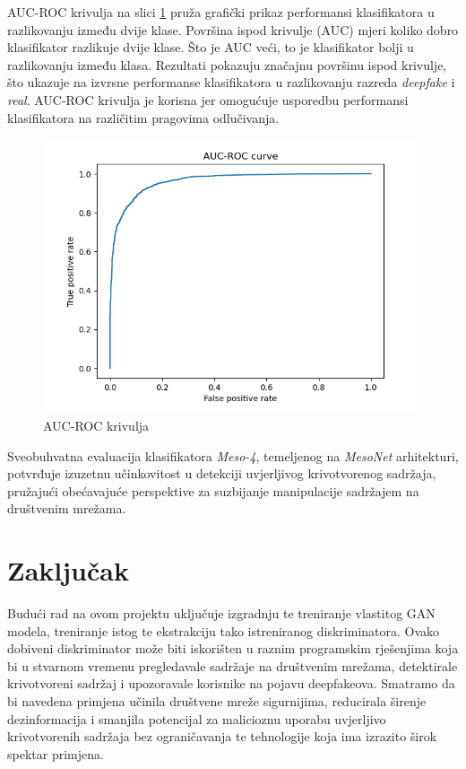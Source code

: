 \documentclass[seminarski, times, utf8]{fer}
\begin{document}
AUC-ROC krivulja na slici \ref{fig:auc} pruža grafički prikaz performansi klasifikatora u razlikovanju između dvije klase. Površina ispod krivulje (AUC) mjeri koliko dobro klasifikator razlikuje dvije klase. Što je AUC veći, to je klasifikator bolji u razlikovanju između klasa. Rezultati pokazuju značajnu površinu ispod krivulje, što ukazuje na izvrsne performanse klasifikatora u razlikovanju razreda \textit{deepfake} i \textit{real}. AUC-ROC krivulja je korisna jer omogućuje usporedbu performansi klasifikatora na različitim pragovima odlučivanja.

\begin{figure}[H]
   \centering
   \includegraphics[width=0.7\linewidth]{slike/auc.png}
   \caption{AUC-ROC krivulja}
   \label{fig:auc}
\end{figure}

Sveobuhvatna evaluacija klasifikatora \textit{Meso-4}, temeljenog na \textit{MesoNet} arhitekturi, potvrđuje izuzetnu učinkovitost u detekciji uvjerljivog krivotvorenog sadržaja, pružajući obećavajuće perspektive za suzbijanje manipulacije sadržajem na društvenim mrežama.


\chapter{Zaključak}
Budući rad na ovom projektu uključuje izgradnju te treniranje vlastitog GAN modela, treniranje istog te ekstrakciju tako istreniranog diskriminatora. Ovako dobiveni diskriminator može biti iskorišten u raznim programskim rješenjima koja bi u stvarnom vremenu pregledavale sadržaje na društvenim mrežama, 
detektirale krivotvoreni sadržaj i upozoravale korisnike na pojavu deepfakeova. Smatramo da bi navedena primjena učinila društvene mreže sigurnijima, reducirala širenje dezinformacija i smanjila potencijal za malicioznu uporabu uvjerljivo krivotvorenih sadržaja bez ograničavanja te tehnologije koja ima izrazito širok spektar primjena. 
\label{pog:zakljucak}
\end{document}
